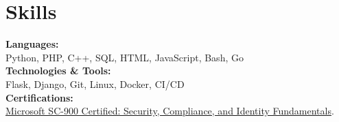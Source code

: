 \documentclass{article}
\begin{document}
\section{Skills}
\color[HTML]{1C033C}\textbf{Languages:} \\[2pt]
\color[HTML]{371e77} \hspace*{4ex} Python, PHP, C++, SQL, HTML, JavaScript, Bash, Go\\[3pt]
\color[HTML]{1C033C}\textbf{Technologies \& Tools:} \\[2pt]
\color[HTML]{371e77} \hspace*{4ex} Flask, Django, Git, Linux, Docker, CI/CD\\[3pt]
\color[HTML]{1C033C}\textbf{Certifications:} \\[2pt]
\color[HTML]{371e77} \hspace*{4ex} \uline{\href{https://learn.microsoft.com/}{Microsoft SC-900 Certified: Security, Compliance, and Identity Fundamentals}}.
\end{document}
